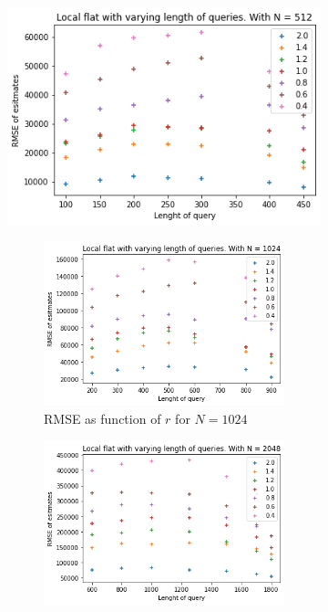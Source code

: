 \documentclass[11pt]{article}
\theoremstyle{definition}
\begin{document}
\begin{figure}[H]
\begin{subfigure}{.4\textwidth}
  \centering
  \includegraphics[width=\linewidth]{figures/local_flat/varying_r/loc_flat_varying_length_N=512.png}
  \caption{RMSE as function of $r$ for $N=512$}
  \label{fig:17}
  \begin{subfigure}{\textwidth}
  \centering
  \includegraphics[width=\linewidth]{figures/local_flat/varying_r/loc_flat_varying_length_N=1024.png}
  \caption{RMSE as function of $r$ for $N=1024$}
  \label{fig:18}
\end{subfigure}
\begin{subfigure}{\textwidth}
  \centering
  \includegraphics[width=\linewidth]{figures/local_flat/varying_r/loc_flat_varying_length_N=2048.png}

\end{subfigure}
\end{subfigure}
\end{figure}
\end{document}
